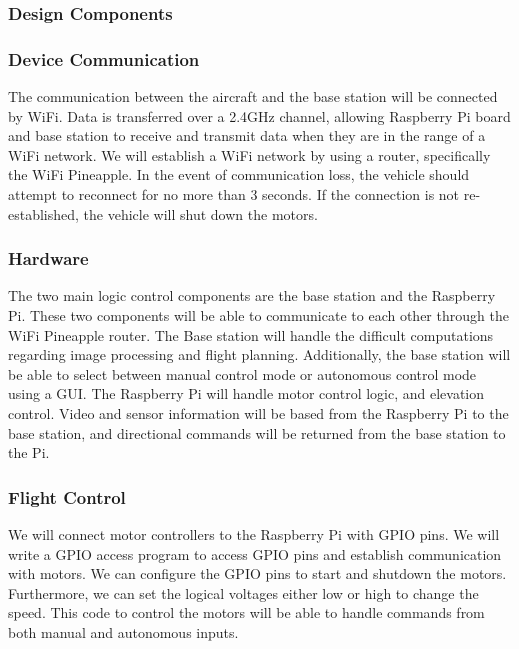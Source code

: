 \documentclass[onecolumn, draftclsnofoot,10pt, compsoc]{IEEEtran}
\begin{document}
\subsubsection{Design Components}

\subsubsection{Device Communication} 

The communication between the aircraft and the base station will be connected by WiFi. Data is transferred over a 2.4GHz channel, allowing Raspberry Pi\cite{r3} board and base station to receive and transmit data when they are in the range of a WiFi network. We will establish a WiFi network by using a router, specifically the WiFi Pineapple\cite{r12}. In the event of communication loss, the vehicle should attempt to reconnect for no more than 3 seconds. If the connection is not re-established, the vehicle will shut down the motors. 


\subsubsection{Hardware}

The two main logic control components are the base station and the Raspberry Pi\cite{r3}. These two components will be able to communicate to each other through the WiFi Pineapple router\cite{r12}. The Base station will handle the difficult computations regarding image processing and flight planning. Additionally, the base station will be able to select between manual control mode or autonomous control mode using a GUI. The Raspberry Pi will handle motor control logic, and elevation control. Video and sensor information will be based from the Raspberry Pi to the base station, and directional commands will be returned from the base station to the Pi. 


\subsubsection{Flight Control}

We will connect motor controllers to the Raspberry Pi with GPIO pins. We will write a GPIO access program to access GPIO pins and establish communication with motors. We can configure the GPIO pins to start and shutdown the motors. Furthermore, we can set the logical voltages either low or high to change the speed. This code to control the motors will be able to handle commands from both manual and autonomous inputs.
\end{document}
